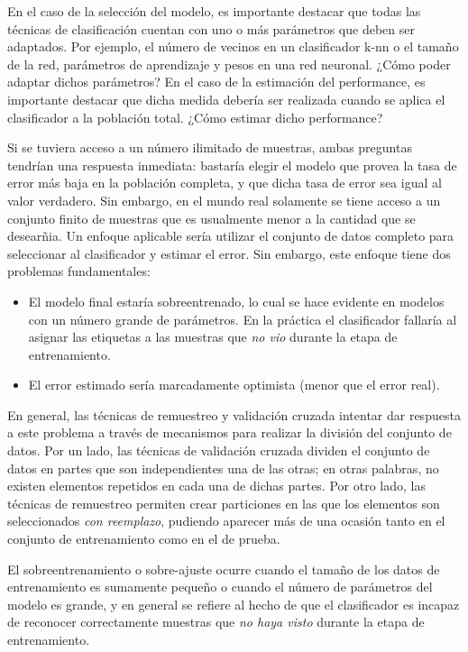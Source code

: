 \documentclass{article}
\begin{document}
En el caso de la selección del modelo, es importante destacar que todas las técnicas de clasificación cuentan con uno o más parámetros que deben ser adaptados.
Por ejemplo, el número de vecinos en un clasificador k-nn o el tamaño de la red, parámetros de aprendizaje y pesos en una red neuronal.
¿Cómo poder adaptar dichos parámetros?
En el caso de la estimación del performance, es importante destacar que dicha medida debería ser realizada cuando se aplica el clasificador a la población total.
¿Cómo estimar dicho performance?

Si se tuviera acceso a un número ilimitado de muestras, ambas preguntas tendrían una respuesta inmediata: bastaría elegir el modelo que provea la tasa de error más baja en la población completa, y que dicha tasa de error sea igual al valor verdadero.
Sin embargo, en el mundo real solamente se tiene acceso a un conjunto finito de muestras que es usualmente menor a la cantidad que se desearñia.
Un enfoque aplicable sería utilizar el conjunto de datos completo para seleccionar al clasificador y estimar el error. Sin embargo, este enfoque tiene dos problemas fundamentales:
\begin{itemize}
	\item El modelo final estaría sobreentrenado, lo cual se hace evidente en modelos con un número grande de parámetros. En la práctica el clasificador fallaría al asignar las etiquetas a las muestras que \emph{no vio} durante la etapa de entrenamiento.
	\item El error estimado sería marcadamente optimista (menor que el error real).
\end{itemize}


En general, las técnicas de remuestreo y validación cruzada intentar dar respuesta a este problema a través de mecanismos para realizar la división del conjunto de  datos.
Por un lado, las técnicas de validación cruzada dividen el conjunto de datos en partes que son independientes una de las otras; en otras palabras, no existen elementos repetidos en cada una de dichas partes.
Por otro lado, las técnicas de remuestreo permiten crear particiones en las que los elementos son seleccionados \emph{con reemplazo}, pudiendo aparecer más de una ocasión tanto en el conjunto de entrenamiento como en el de prueba.

El sobreentrenamiento o sobre-ajuste ocurre cuando el tamaño de los datos de entrenamiento es sumamente pequeño o cuando el número de parámetros del modelo es grande, y en general se refiere al hecho de que el clasificador es incapaz de reconocer correctamente muestras que \emph{no haya visto} durante la etapa de entrenamiento.
\end{document}
